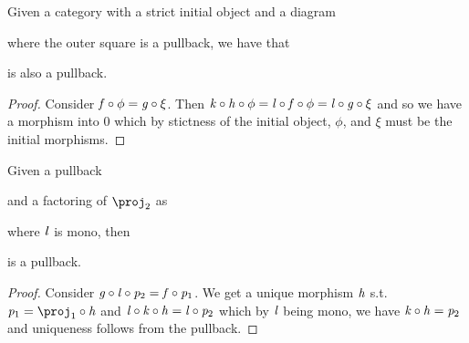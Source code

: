 \begin{lemma}\label{lem:pullback-initial-obj}
    Given a category with a strict initial object and a diagram
    where the outer square is a pullback, we have that
     is also a pullback.
\end{lemma}
\begin{proof}
    Consider $\mathit{f} \circ \phi = \mathit{g} \circ \xi$. 
    Then $\mathit{k} \circ \mathit{h} \circ \phi = \mathit{l} \circ \mathit{f} \circ \phi = \mathit{l} \circ \mathit{g} \circ \xi$ and so we have a morphism into $0$ which by stictness of the initial object, $\phi$, and $\xi$ must be the initial morphisms.
\end{proof}

\begin{lemma}\label{lem:pullback-factoring}
    Given a pullback
    and a factoring of $\proj_2$ as 
     where $\mathit{l}$ is mono, then 
     is a pullback.
\end{lemma}
\begin{proof}
    Consider $\mathit{g} \circ \mathit{l} \circ \mathit{p}_2 = \mathit{f} \circ \mathit{p}_1$. 
    We get a unique morphism $\mathit{h}$ s.t. $\vp_1 = \proj_1 \comp \vh$ and $\mathit{l} \circ \mathit{k} \circ \mathit{h} = \mathit{l} \circ \mathit{p}_2$
    which by $\mathit{l}$ being mono, we have $\mathit{k} \circ \mathit{h} = \mathit{p}_2$ and uniqueness follows from the pullback.
\end{proof}

